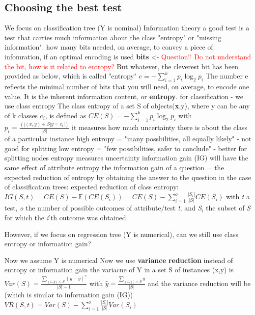 \subsection{Choosing the best test}
\begin{outline}
    \1 We focus on classification tree (Y is nominal)
    \1 Information theory
        \2 a good test is a test that carries much information about the class
        \2 "entropy" or "missing information": how many bits needed, on average, to convey a piece of infomration, if an optimal encoding is used
        \2 \textbf{bits} <- \textcolor{red}{Question!! Do not understand the bit, how is it related to entropy?}
        \2 But whatever, the cleverest bit has been provided as below, which is called "entropy"
            \3 $e=-\sum_{i=1}^{k} p_{i} \log_{2}{p_{i}}$
        \2 The number e reflects the minimal number of bits that you will need, on average, to encode one value. It is the inherent information content, or \textbf{entropy}.
    \1 for classification - we use class entropy
        \2 The class entropy of a set S of objects(\textbf{x},y), where y can be any of k classes c$_{i}$, is defined as
            \3 $CE(S) = - \sum_{i=1}^{k} p_{i} \log_{2}{p_{i}}$ with $p_{i} = \frac{(|(x,y) \in S|y=c_{i}|)}{|S|}$
            \3 it measures how much uncertainty there is about the class of a particular instance
        \2 high entropy = "many possbilities, all equally likely" - not good for splitting
        \2 low entropy = "few possibilities, safer to conclude" - better for splitting nodes
        \2 entropy measures uncertainty
    \1 information gain (IG)
        \2 will have the same effect of attribute entropy
        \2 the information gain of a question = the expected reduction of entropy by obtaining the answer to the question
        \2 in the case of classification trees: expected reduction of class entropy:
            \3 $IG(S,t) = CE(S) - \mathbb{E} (CE(S_{i})) = CE(S) - \sum_{i=1}^{o} \frac{|S_{i}|}{|S|} CE(S_{i})$
            \3 with \emph{t} a test, \emph{o} the number of possible outcomes of attribute/test \emph{t}, and \emph{S$_{i}$} the subset of \emph{S} for which the \emph{i}'th outcome was obtained.
\end{outline}
However, if we focus on regression tree (Y is numerical), can we still use class entropy or information gain?
\begin{outline}
    \1 Now we assume Y is numerical
    \1 Now we use \textbf{variance reduction} instead of entropy or information gain
        \2 the variacne of Y in a set S of instances (x,y) is
        \2 $Var(S) = \frac{\sum_{(x,y) \in S} (y-\hat{y})^{2}}{|S|-1}$ with $\hat{y} = \frac{\sum_{(x,y) \in S} y}{|S|}$
        \2 and the variance reduction will be (which is similar to information gain (IG))
        \2 $VR(S,t) = Var(S) - \sum_{i=1}^{o} \frac{|S_{i}|}{|S|} Var(S_{i})$
\end{outline}

